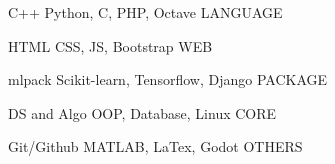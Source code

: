 

\begin{cvhonors}

  \cvhonor
    {C++} %
    {Python, C, PHP, Octave} %
    {}
    {LANGUAGE} %

  \cvhonor
    {HTML} %
    {CSS, JS, Bootstrap} %
    {}
    {WEB} %

  \cvhonor
    {mlpack} %
    {Scikit-learn, Tensorflow, Django} %
    {}
    {PACKAGE} %

  \cvhonor
    {DS and Algo} %
    {OOP, Database, Linux} %
    {}
    {CORE} %

  \cvhonor
    {Git/Github} %
    {MATLAB, LaTex, Godot} %
    {}
    {OTHERS} %

\end{cvhonors}